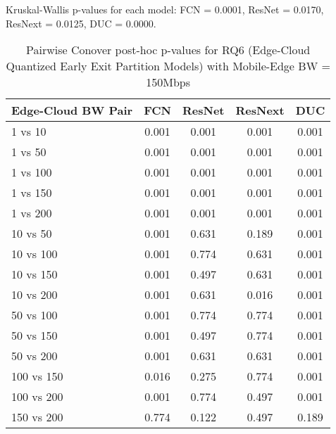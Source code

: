 \begin{table}[h]
\centering
\caption{Pairwise Conover post-hoc p-values for RQ6 (Edge-Cloud Quantized Early Exit Partition Models) with Mobile-Edge BW = 150Mbps}
\label{tab:conover_edge_cloud_quantized_earlyexit_partition_me150}
\smallskip
Kruskal-Wallis p-values for each model: FCN = 0.0001, ResNet = 0.0170, ResNext = 0.0125, DUC = 0.0000.

\begin{tabular}{lcccc}
\toprule
Edge-Cloud BW Pair & FCN & ResNet & ResNext & DUC \\
\midrule
1 vs 10 & 0.001 & 0.001 & 0.001 & 0.001 \\
1 vs 50 & 0.001 & 0.001 & 0.001 & 0.001 \\
1 vs 100 & 0.001 & 0.001 & 0.001 & 0.001 \\
1 vs 150 & 0.001 & 0.001 & 0.001 & 0.001 \\
1 vs 200 & 0.001 & 0.001 & 0.001 & 0.001 \\
10 vs 50 & 0.001 & 0.631 & 0.189 & 0.001 \\
10 vs 100 & 0.001 & 0.774 & 0.631 & 0.001 \\
10 vs 150 & 0.001 & 0.497 & 0.631 & 0.001 \\
10 vs 200 & 0.001 & 0.631 & 0.016 & 0.001 \\
50 vs 100 & 0.001 & 0.774 & 0.774 & 0.001 \\
50 vs 150 & 0.001 & 0.497 & 0.774 & 0.001 \\
50 vs 200 & 0.001 & 0.631 & 0.631 & 0.001 \\
100 vs 150 & 0.016 & 0.275 & 0.774 & 0.001 \\
100 vs 200 & 0.001 & 0.774 & 0.497 & 0.001 \\
150 vs 200 & 0.774 & 0.122 & 0.497 & 0.189 \\
\bottomrule
\end{tabular}
\end{table}

